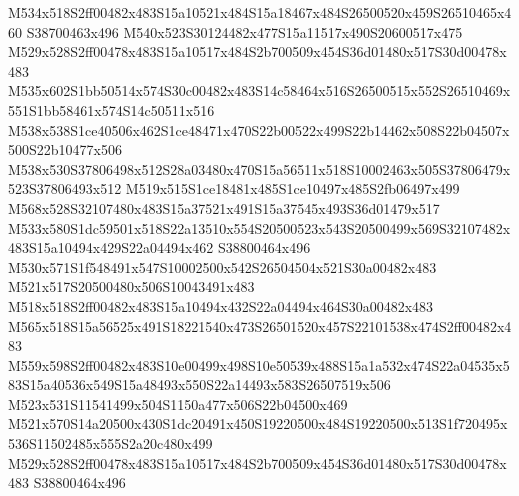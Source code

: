 \documentclass{article}
\begin{document}
\begin{multicols}{2}


M534x518S2ff00482x483S15a10521x484S15a18467x484S26500520x459S26510465x460 S38700463x496 M540x523S30124482x477S15a11517x490S20600517x475 M529x528S2ff00478x483S15a10517x484S2b700509x454S36d01480x517S30d00478x483 M535x602S1bb50514x574S30c00482x483S14c58464x516S26500515x552S26510469x551S1bb58461x574S14c50511x516 M538x538S1ce40506x462S1ce48471x470S22b00522x499S22b14462x508S22b04507x500S22b10477x506 M538x530S37806498x512S28a03480x470S15a56511x518S10002463x505S37806479x523S37806493x512 M519x515S1ce18481x485S1ce10497x485S2fb06497x499 M568x528S32107480x483S15a37521x491S15a37545x493S36d01479x517 M533x580S1dc59501x518S22a13510x554S20500523x543S20500499x569S32107482x483S15a10494x429S22a04494x462 S38800464x496 M530x571S1f548491x547S10002500x542S26504504x521S30a00482x483 M521x517S20500480x506S10043491x483 M518x518S2ff00482x483S15a10494x432S22a04494x464S30a00482x483 M565x518S15a56525x491S18221540x473S26501520x457S22101538x474S2ff00482x483 M559x598S2ff00482x483S10e00499x498S10e50539x488S15a1a532x474S22a04535x583S15a40536x549S15a48493x550S22a14493x583S26507519x506 M523x531S11541499x504S1150a477x506S22b04500x469 M521x570S14a20500x430S1dc20491x450S19220500x484S19220500x513S1f720495x536S11502485x555S2a20c480x499 M529x528S2ff00478x483S15a10517x484S2b700509x454S36d01480x517S30d00478x483 S38800464x496





\end{multicols}
\end{document}
